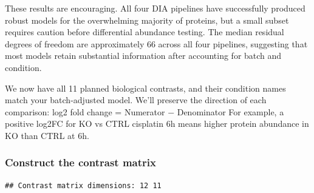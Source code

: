 \documentclass[
  10pt,
]{article}
\begin{document}
These results are encouraging. All four DIA pipelines have successfully
produced robust models for the overwhelming majority of proteins, but a
small subset requires caution before differential abundance testing. The
median residual degrees of freedom are approximately 66 across all four
pipelines, suggesting that most models retain substantial information
after accounting for batch and condition.

We now have all 11 planned biological contrasts, and their condition
names match your batch-adjusted model. We'll preserve the direction of
each comparison: log2 fold change = Numerator − Denominator For example,
a positive log2FC for KO vs CTRL cisplatin 6h means higher protein
abundance in KO than CTRL at 6h.

\subsubsection{Construct the contrast
matrix}\label{construct-the-contrast-matrix}

\begin{verbatim}
## Contrast matrix dimensions: 12 11
\end{verbatim}
\end{document}
